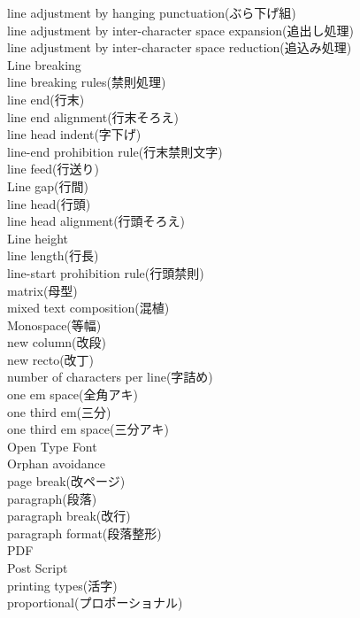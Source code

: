 \begin{description}
    \item[line adjustment by hanging punctuation(ぶら下げ組)]
    \item[line adjustment by inter-character space expansion(追出し処理)]
    \item[line adjustment by inter-character space reduction(追込み処理)]
    \item[Line breaking]
    \item[line breaking rules(禁則処理)]
    \item[line end(行末)]
    \item[line end alignment(行末そろえ)]
    \item[line head indent(字下げ)]
    \item[line-end prohibition rule(行末禁則文字)]
    \item[line feed(行送り)]
    \item[Line gap(行間)]
    \item[line head(行頭)]
    \item[line head alignment(行頭そろえ)]
    \item[Line height]
    \item[line length(行長)]
    \item[line-start prohibition rule(行頭禁則)]
    \item[matrix(母型)]
    \item[mixed text composition(混植)]
    \item[Monospace(等幅)]
    \item[new column(改段)]
    \item[new recto(改丁)]
    \item[number of characters per line(字詰め)]
    \item[one em space(全角アキ)]
    \item[one third em(三分)]
    \item[one third em space(三分アキ)]
    \item[Open Type Font]
    \item[Orphan avoidance]
    \item[page break(改ページ)]
    \item[paragraph(段落)]
    \item[paragraph break(改行)]
    \item[paragraph format(段落整形)]
    \item[PDF]
    \item[Post Script]
    \item[printing types(活字)]
    \item[proportional(プロポーショナル)]

\end{description}
